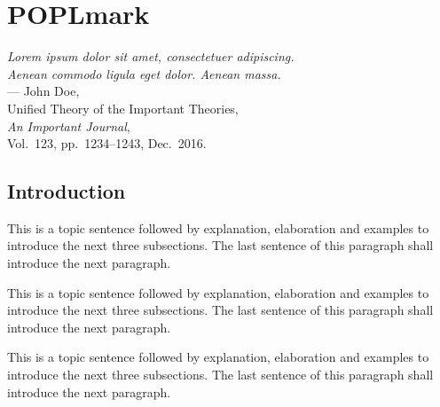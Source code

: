 

%
%
\chapter{POPLmark}
\label{ch:appendixOne}

\begin{flushright}
{\slshape Lorem ipsum dolor sit amet, consectetuer adipiscing.}\\
{\slshape Aenean commodo ligula eget dolor. Aenean massa.}\\
\medskip
--- John Doe,\\
Unified Theory of the Important Theories,\\
{\slshape An Important Journal},\\
Vol.~123, pp.~1234--1243, Dec.~2016.\\
\end{flushright}

\bigskip

\section{Introduction}
\label{sec:ch_1_introduction}

This is a topic sentence followed by explanation, elaboration and examples to introduce the next three subsections. The last sentence of this paragraph shall introduce the next paragraph. \lipsum[1]

This is a topic sentence followed by explanation, elaboration and examples to introduce the next three subsections. The last sentence of this paragraph shall introduce the next paragraph. \lipsum[1]

This is a topic sentence followed by explanation, elaboration and examples to introduce the next three subsections. The last sentence of this paragraph shall introduce the next paragraph. \lipsum[1]

